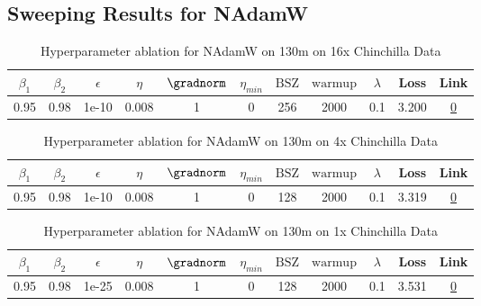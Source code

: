 \subsection{Sweeping Results for NAdamW}%
\begin{table}[H]
\centering
\caption{Hyperparameter ablation for NAdamW on 130m on 16x Chinchilla Data}
\label{tab:ablation_nadamw_130m_16}
\begin{tabular}{ccccccccccc}
\toprule
$\beta_1$ & $\beta_2$ & $\epsilon$ & $\eta$ & $\gradnorm$ & $\eta_{min}$ & $\mathrm{BSZ}$ & $\mathrm{warmup}$ & $\lambda$ & Loss & Link \\
\midrule
0.95 & 0.98 & 1e-10 & 0.008 & 1 & 0 & 256 & 2000 & 0.1 & 3.200 & \href{https://wandb.ai/stanford-mercury/optimizer-scaling/runs/sweep-130m-42B-nadamw6383f8lr0.008-wd0.1-minlr0-warmup2000-b10.9-d7e8d3}{0} \\
\midrule
\bottomrule
\end{tabular}
\end{table}

\begin{table}[H]
\centering
\caption{Hyperparameter ablation for NAdamW on 130m on 4x Chinchilla Data}
\label{tab:ablation_nadamw_130m_4}
\begin{tabular}{ccccccccccc}
\toprule
$\beta_1$ & $\beta_2$ & $\epsilon$ & $\eta$ & $\gradnorm$ & $\eta_{min}$ & $\mathrm{BSZ}$ & $\mathrm{warmup}$ & $\lambda$ & Loss & Link \\
\midrule
0.95 & 0.98 & 1e-10 & 0.008 & 1 & 0 & 128 & 2000 & 0.1 & 3.319 & \href{https://wandb.ai/stanford-mercury/optimizer-scaling/runs/sweep-130m-10B-nadamwaee88elr0.008-wd0.1-minlr0-warmup2000-b10.9-75fe1d}{0} \\
\midrule
\bottomrule
\end{tabular}
\end{table}

\begin{table}[H]
\centering
\caption{Hyperparameter ablation for NAdamW on 130m on 1x Chinchilla Data}
\label{tab:ablation_nadamw_130m_1}
\begin{tabular}{ccccccccccc}
\toprule
$\beta_1$ & $\beta_2$ & $\epsilon$ & $\eta$ & $\gradnorm$ & $\eta_{min}$ & $\mathrm{BSZ}$ & $\mathrm{warmup}$ & $\lambda$ & Loss & Link \\
\midrule
0.95 & 0.98 & 1e-25 & 0.008 & 1 & 0 & 128 & 2000 & 0.1 & 3.531 & \href{https://wandb.ai/stanford-mercury/optimizer-scaling/runs/sweep-130m-2B-nadamw2de195lr0.008-wd0.1-minlr0-warmup2000-b10.95-437e7c}{0} \\
\midrule
\bottomrule
\end{tabular}
\end{table}

